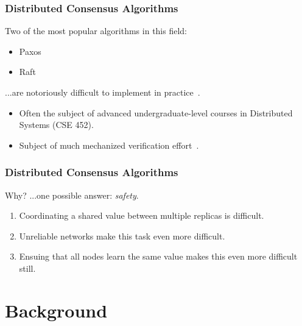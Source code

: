 \documentclass[aspectratio=169,compress,handout]{beamer}
\begin{document}
  \begin{frame}
    \frametitle{Distributed Consensus Algorithms}
    Two of the most popular algorithms in this field:
    \begin{itemize}
      \item Paxos~\citep{lamport98}
      \item Raft~\citep{ongaro14}
    \end{itemize}
    \pause
    ...are notoriously difficult to implement in practice~\citep{howard20}.
    \begin{itemize}
      \item<3-> Often the subject of advanced undergraduate-level courses in
        Distributed Systems (CSE 452).
      \item<4-> Subject of much mechanized verification
        effort~\citep{wilcox15,woos16}.
    \end{itemize}
  \end{frame}

  \begin{frame}
    \frametitle{Distributed Consensus Algorithms}
    Why?
    \pause
    ...one possible answer: \emph{safety}.
    \begin{enumerate}[<+->]
      \item Coordinating a shared value between multiple replicas is difficult.
      \item Unreliable networks make this task even more difficult.
      \item Ensuing that all nodes learn the same value makes this even more
        difficult still.
    \end{enumerate}
  \end{frame}

  \section{Background}
\end{document}
